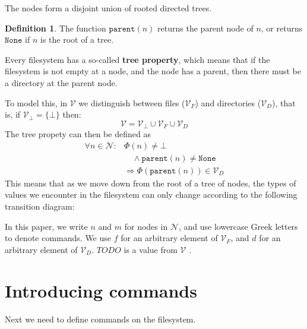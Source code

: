 \documentclass[12pt]{article}
\newcommand{\setv}{\mathcal{V}} %
\newcommand{\setvx}[1]{\mathcal{V}_{#1}} %
\newcommand{\setf}{\setvx{F}} %
\newcommand{\setd}{\setvx{D}} %
\newcommand{\setb}{\setvx{\empt}} %
\newcommand{\setn}{\mathcal{N}} %
\newcommand{\empt}{\bot}
\newcommand{\parent}{\mathtt{parent}}
\newcommand{\topnode}{\mathtt{None}} %
\newcommand{\FS}{\Phi} %
\newcommand{\vald}{d} %
\newcommand{\valf}{f} %
\theoremstyle{definition}
\newtheorem{mydef}{Definition}
\begin{document}
The nodes form a disjoint union of rooted directed trees.
\begin{mydef}
The function $\parent(n)$ returns the parent node of $n$, or
returns $\topnode$ if $n$ is the root of a tree.
\end{mydef}

Every filesystem has a so-called \textbf{tree property}, which means that
if the filesystem is not empty at a node, and the node has a parent,
then there must be a directory at the parent node.

To model this, in $\setv$ we distinguish between files ($\setf$) and directories ($\setd$), that is,
if $\setb = \{\empt\}$ then:
\[ \setv = \setb \cup \setf \cup \setd \]
The tree propety can then be defined as
\begin{align*}
\forall n\in\setn: &\FS(n) \neq \empt \\ %
&\quad\wedge \parent(n) \neq \topnode \\
&\Rightarrow \FS(\parent(n)) \in \setd 
\end{align*}
This means that as we move down from the root of a tree of nodes,
the types of values we encounter in the filesystem can only change according to the following
transition diagram:



In this paper, 
we write $n$ and $m$ for nodes in $\setn$,
and use lowercase Greek letters to denote commands. %
We use $\valf$ for an arbitrary element of $\setf$, and $\vald$ for an arbitrary element
of $\setd$. $TODO$ is a value from $\setv$ .






\section{Introducing commands}

Next we need to define commands on the filesystem.

\end{document}
